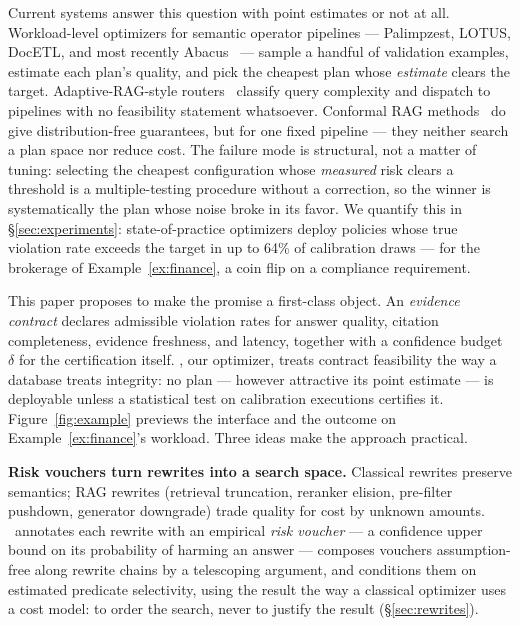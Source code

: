 Current systems answer this question with point estimates or not at all.
Workload-level optimizers for semantic operator pipelines --- Palimpzest,
LOTUS, DocETL, and most recently Abacus~\cite{russo2025abacus} --- sample
a handful of validation examples, estimate each plan's quality, and pick
the cheapest plan whose \emph{estimate} clears the target.
Adaptive-RAG-style routers~\cite{jeong2024adaptiverag} classify query
complexity and dispatch to pipelines with no feasibility statement
whatsoever. Conformal RAG methods~\cite{li2024traq,kang2024crag} do give
distribution-free guarantees, but for one fixed pipeline --- they neither
search a plan space nor reduce cost. The failure mode is structural, not
a matter of tuning: selecting the cheapest configuration whose
\emph{measured} risk clears a threshold is a multiple-testing procedure
without a correction, so the winner is systematically the plan whose
noise broke in its favor. We quantify this in \S\ref{sec:experiments}:
state-of-practice optimizers deploy policies whose true violation rate
exceeds the target in up to 64\% of calibration draws --- for the
brokerage of Example~\ref{ex:finance}, a coin flip on a compliance
requirement.

This paper proposes to make the promise a first-class object. An
\emph{evidence contract} declares admissible violation rates for answer
quality, citation completeness, evidence freshness, and latency,
together with a confidence budget $\delta$ for the certification itself.
\system, our optimizer, treats contract feasibility the way a database
treats integrity: no plan --- however attractive its point estimate ---
is deployable unless a statistical test on calibration executions
certifies it. Figure~\ref{fig:example} previews the interface and the
outcome on Example~\ref{ex:finance}'s workload. Three ideas make the
approach practical.

\textbf{Risk vouchers turn rewrites into a search space.} Classical
rewrites preserve semantics; RAG rewrites (retrieval truncation,
reranker elision, pre-filter pushdown, generator downgrade) trade
quality for cost by unknown amounts. \system\ annotates each rewrite
with an empirical \emph{risk voucher} --- a confidence upper bound on
its probability of harming an answer --- composes vouchers
assumption-free along rewrite chains by a telescoping argument, and
conditions them on estimated predicate selectivity, using the result
the way a classical optimizer uses a cost model: to order the
search, never to justify the result (\S\ref{sec:rewrites}).

